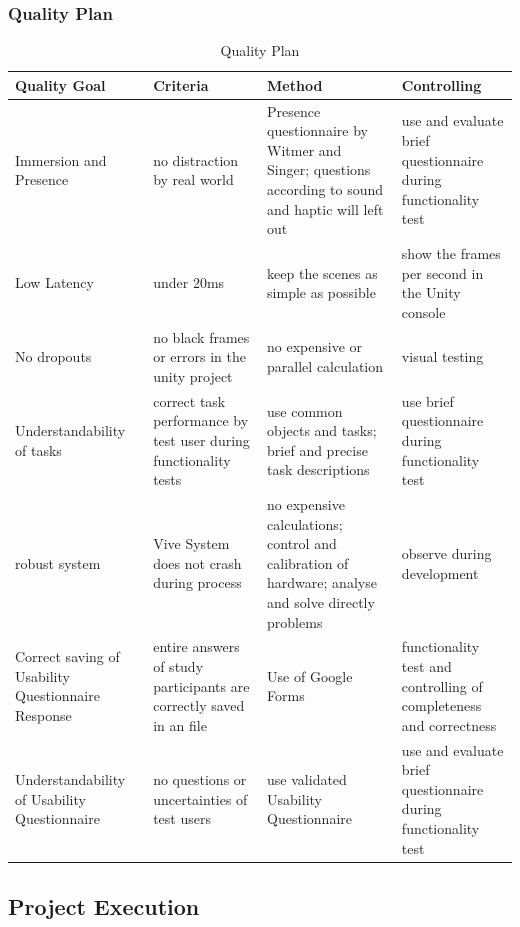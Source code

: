 \subsubsection{Quality Plan}\label{sec:PMQualityPlan}
\begin{table}[H]
	\centering
	\begin{tabular}{|p{3cm}|p{3 cm}|p{3.5 cm}|p{3.5cm}|}
		\hline
		\Absatzbox{}
		\textbf{Quality Goal}&	\textbf{Criteria} &\textbf{Method} &	\textbf{Controlling}\\ \hline
	Immersion and Presence	& no distraction by real world &	Presence questionnaire by Witmer and Singer; questions according to sound and haptic will left out	& use and evaluate brief questionnaire during functionality test\\ \hline	
Low Latency	& under $20$ms &	keep the scenes as simple as possible & show the frames per second in the Unity console\\ \hline		
No dropouts	& no black frames or errors in the unity project & no expensive or parallel calculation & visual testing\\ \hline	
Understandability of tasks	& correct task performance by test user during functionality tests & use common objects and tasks; brief and precise task descriptions & use brief questionnaire during functionality test\\ \hline	
robust system & Vive System does not crash during process & no expensive calculations; control and calibration of hardware; analyse and solve directly problems & observe during development
\\ \hline
Correct saving of Usability Questionnaire Response & entire answers of study participants are correctly saved in an file & Use of Google Forms & functionality test and controlling of completeness and correctness\\ \hline
Understandability of Usability Questionnaire & no questions or uncertainties of test users& use validated Usability Questionnaire & use and evaluate brief questionnaire during functionality test\\ \hline
	\end{tabular}
	\caption[]{Quality Plan}
	\label{tab:Qaulity Plan}
\end{table}
\subsection{Project Execution} \label{sec:ProjectExecution}

